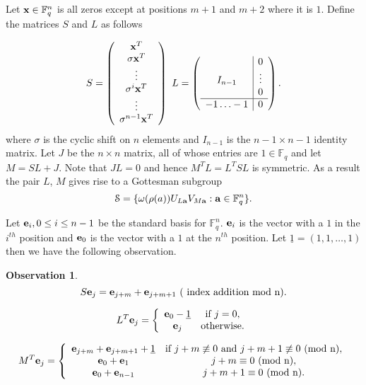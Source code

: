 \documentclass{Rinton-P9x6}
\newtheorem{observation}[theorem]{Observation}
\newcommand{\GF}[2][]{{\ensuremath{\mathbb{F}_{#2}^{#1}}}}
\renewcommand{\a}{{\bf a}}
\newcommand{\e}{{\bf e}}
\renewcommand{\S}{{\ensuremath{\mathcal{S}}}}
\begin{document}
Let ${\bf x} \in \GF[n]{q}$ is all zeros except at positions $m+1$ and
$m+2$ where it is $1$. Define the matrices $S$ and $L$ as follows

\[
S = \left( \begin{array}{c}
                    {\bf x}^T\\
                    \sigma{\bf x}^T\\
                    \vdots\\
                    \sigma^i{\bf x}^T\\
                    \vdots\\
                    \sigma^{n-1}{\bf x}^T
                  \end{array}
                \right)\  L =
                \left( 
                 \begin{array}{c|c}
                    &  0\\
                    I_{n-1}   & \vdots \\
                    & 0 \\
                    \hline
                    -1 \ldots -1     & 0 
                  \end{array}
                \right).
\] 
where $\sigma$ is the cyclic shift on $n$ elements and $I_{n-1}$ is
the $n-1 \times n-1$ identity matrix. Let $J$ be the $n\times n $
matrix, all of whose entries are $1 \in \GF{q}$ and let $M = SL + J$.
Note that $JL = 0$ and hence $M^TL = L^T S L$ is symmetric. As a
result the pair $L$, $M$ gives rise to a Gottesman subgroup
\[
\S = \{ \omega(\rho(a)) U_{L\a} V_{M\a} : \a \in \GF[n]{q} \}.
\]

Let $\e_i, 0 \leq i \leq n - 1$ be the standard basis for $\GF[n]{q}$.
$\e_i$ is the vector with a $1$ in the $i^{th}$ position and $\e_0$ is
the vector with a $1$ at the $n^{th}$ position. Let $\underline{1} =
(1,1,\ldots,1)$ then we have the following observation.

\begin{observation}
  \[
  S \e_j  = \e_{j + m} + \e_{j + m + 1}\ ( \textrm{ index addition mod n} ).
  \]

  \[
  L^T \e_j = \left\{
    \begin{array}{cc}
      \e_0 - \underline{1} & \textrm{if }j = 0,\\
      \e_j & \textrm{otherwise.}\\
    \end{array}
  \right.
\]


\[
M^T \e_j = \left\{
  \begin{array}{cc}
    \e_{j+m} + \e_{j+m+1} + \underline{1} & \textrm{if } j+m \not \equiv 0 \textrm{ and } 
    j+m+1 \not \equiv  0\ (\textrm{mod n}),\\
    \e_{0} + \e_1  & j+m \equiv 0\ (\textrm{mod n}),\\
    \e_0 + \e_{n-1} & j+m+1 \equiv 0\ (\textrm{mod n}).
    \end{array}
    \right.
\]
\end{observation}
\end{document}
